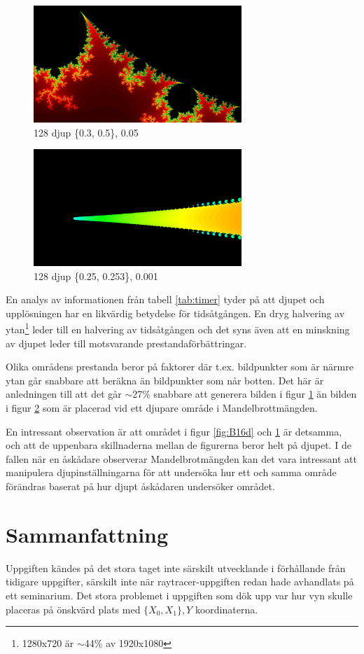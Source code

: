 \documentclass[a4paper, 11pt]{article}
\begin{document}
\begin{figure}[h!]
  \centering
    \includegraphics[width=0.7\textwidth]{1080p128zoneb}
  \caption{128 djup \{0.3, 0.5\}, 0.05}
  \label{fig:B128d}
\end{figure}

\begin{figure}[h!]
  \centering
    \includegraphics[width=0.7\textwidth]{1080p128zonea}
  \caption{128 djup \{0.25, 0.253\}, 0.001}
  \label{fig:A128d}
\end{figure}

En analys av informationen från tabell \ref{tab:timer} tyder på att djupet och upplösningen har en likvärdig betydelse för tidsåtgången. En dryg halvering av ytan\footnote{1280x720 är $\sim$44\% av 1920x1080} leder till en halvering av tidsåtgången och det syns även att en minskning av djupet leder till motsvarande prestandaförbättringar.

Olika områdens prestanda beror på faktorer där t.ex. bildpunkter som är närmre ytan går snabbare att beräkna än bildpunkter som når botten. Det här är anledningen till att det går $\sim$27\% snabbare att generera bilden i figur \ref{fig:B128d} än bilden i figur \ref{fig:A128d} som är placerad vid ett djupare område i Mandelbrottmängden.

En intressant observation är att området i figur \ref{fig:B16d} och \ref{fig:B128d} är detsamma, och att de uppenbara skillnaderna mellan de figurerna beror helt på djupet. I de fallen när en åskådare observerar Mandelbrotmängden kan det vara intressant att manipulera djupinställningarna för att undersöka hur ett och samma område förändras baserat på hur djupt åskådaren undersöker området.

\section{Sammanfattning}
Uppgiften kändes på det stora taget inte särskilt utvecklande i förhållande från tidigare uppgifter, särskilt inte när raytracer-uppgiften redan hade avhandlats på ett seminarium. Det stora problemet i uppgiften som dök upp var hur vyn skulle placeras på önskvärd plats med $\{X_0, X_1\}, Y$ koordinaterna.
\end{document}
